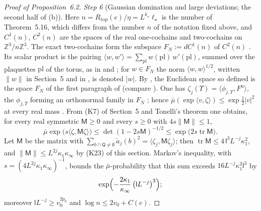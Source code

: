 \documentclass[11pt,letterpaper,reqno]{amsart}
\theoremstyle{definition}
\begin{document}
\begin{proof}[Proof of Proposition~6.2]
\emph{Step 6} (Gaussian domination and large deviations; the second half of (b)).
Here $n=R_{\mathrm{top}}(e)/\eta=L^{k_\star}\ell_\star$ is the number of Theorem~5.16, which differs from the number $n$ of the notation fixed above, and $C^1(n)$, $C^2(n)$ are the spaces of the real one-cochains and two-cochains on $\mathbb Z^3/n\mathbb Z^3$.
The exact two-cochains form the subspace $F_N:=dC^1(n)$ of $C^2(n)$ \cite[Sections~I.7.1, I.7.3]{QEDIII}.
Its scalar product is the pairing $\langle w,\allowbreak w'\rangle=\allowbreak \sum_{\mathrm{pl}}w(\mathrm{pl})\,\allowbreak w'(\mathrm{pl})$, summed over the plaquettes $\mathrm{pl}$ of the torus, as in \cite[Definition~2.6]{QEDII} and \cite[Section~I.7.1]{QEDIII};
for $w\in F_N$ the norm $\langle w,w\rangle^{1/2}$, written $\|w\|$ in Section~5 and in \cite[Section~I.7.1]{QEDIII}, is denoted $|w|$.
By \cite[Chapter~29, P1, (Q7.4)]{QEDIII}, the Euclidean space so defined is the space $F_N$ of the first paragraph of \cite[Section~14.5.2]{QEDI} (compare \cite[Section~5.2.1]{QEDI}).
One has $\zeta_j(\Upsilon)=\langle\phi_{j,\Upsilon},F^{\mathrm u}\rangle$, the $\phi_{j,\Upsilon}$ forming an orthonormal family in $F_N$ \cite[Theorem~14.17\,(c)]{QEDI};
hence $\bar\mu(\exp\langle v,\zeta\rangle)\le\exp\frac12|v|^2$ at every real mass \cite[Proposition~31.1\,(d)]{QEDIII}.
From (K7) of Section~5 and Tonelli's theorem one obtains, for every real symmetric $\mathsf M\ge0$ and every $s\ge0$ with $4s\|\mathsf M\|\le1$,
\begin{equation*}
\bar\mu\exp\bigl(s\langle\zeta,\mathsf M\zeta\rangle\bigr)\le\det(1-2s\mathsf M)^{-1/2}\le\exp\bigl(2s\operatorname{tr}\mathsf M\bigr).
\end{equation*}
Let $\mathsf M$ be the matrix with $\sum_{b\cap\mathsf Q\ne\emptyset}\tilde a_j(b)^2=\allowbreak \langle\zeta_j,\allowbreak \mathsf M\zeta_j\rangle$;
then $\operatorname{tr}\mathsf M\le4\,\mathsf l^3L^{-j}\kappa_1^2$, and $\|\mathsf M\|\le L^{2j}\kappa_1\kappa_\infty$ by (K23) of this section.
Markov's inequality, with $s=(4L^{2j}\kappa_1\kappa_\infty)^{-1}$, bounds the $\bar\mu$-probability that this sum exceeds $16L^{-j}\kappa_1^2\mathsf l^3$ by
\begin{equation*}
\exp\Bigl(-\frac{2\kappa_1}{\kappa_\infty}\,\bigl(\mathsf lL^{-j}\bigr)^3\Bigr);
\end{equation*}
moreover $\mathsf lL^{-j}\ge v_0^{2p_0}$ and $\log n\le2v_0+C(e)$.


\end{proof}
\end{document}
